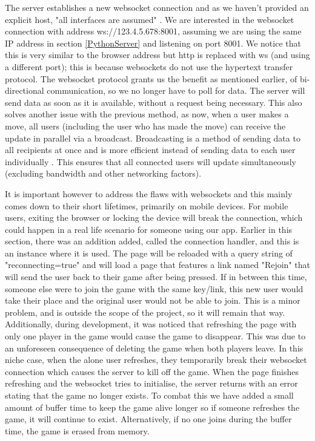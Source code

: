 The server establishes a new websocket connection and as we haven't provided an explicit host, "all interfaces are assumed" \cite{NoHost}. We are interested in the websocket connection with address ws://123.4.5.678:8001, assuming we are using the same IP address in section \ref{PythonServer} and listening on port 8001. We notice that this is very similar to the browser address but http is replaced with ws (and using a different port); this is because websockets do not use the hypertext transfer protocol. The websocket protocol grants us the benefit as mentioned earlier, of bi-directional communication, so we no longer have to poll for data. The server will send data as soon as it is available, without a request being necessary. This also solves another issue with the previous method, as now, when a user makes a move, all users (including the user who has made the move) can receive the update in parallel via a broadcast. Broadcasting is a method of sending data to all recipients at once and is more efficient instead of sending data to each user individually \cite{Broadcast}. This ensures that all connected users will update simultaneously (excluding bandwidth and other networking factors).

It is important however to address the flaws with websockets and this mainly comes down to their short lifetimes, primarily on mobile devices. For mobile users, exiting the browser or locking the device will break the connection, which could happen in a real life scenario for someone using our app. Earlier in this section, there was an addition added, called the connection handler, and this is an instance where it is used. The page will be reloaded with a query string of "reconnecting=true" and will load a page that features a link named "Rejoin" that will send the user back to their game after being pressed. If in between this time, someone else were to join the game with the same key/link, this new user would take their place and the original user would not be able to join. This is a minor problem, and is outside the scope of the project, so it will remain that way. Additionally, during development, it was noticed that refreshing the page with only one player in the game would cause the game to disappear. This was due to an unforeseen consequence of deleting the game when both players leave. In this niche case, when the alone user refreshes, they temporarily break their websocket connection which causes the server to kill off the game. When the page finishes refreshing and the websocket tries to initialise, the server returns with an error stating that the game no longer exists. To combat this we have added a small amount of buffer time to keep the game alive longer so if someone refreshes the game, it will continue to exist. Alternatively, if no one joins during the buffer time, the game is erased from memory.

